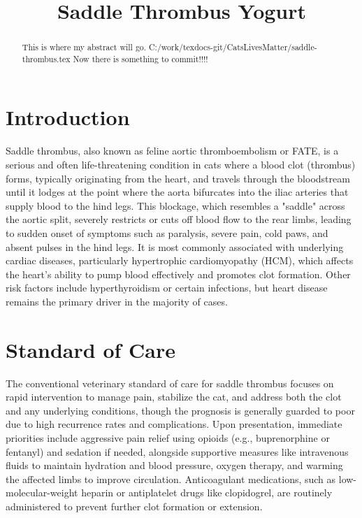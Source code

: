 \documentclass[]{article}
\title{Saddle Thrombus Yogurt}
\author{}
\begin{document}
\maketitle

\begin{abstract}
This is where my abstract will go.
C:/work/texdocs-git/CatsLivesMatter/saddle-thrombus.tex
Now there is something to commit!!!!
\end{abstract}

\section{Introduction}

Saddle thrombus, also known as feline aortic thromboembolism or FATE, is a serious and often life-threatening condition in cats where a blood clot (thrombus) forms, typically originating from the heart, and travels through the bloodstream until it lodges at the point where the aorta bifurcates into the iliac arteries that supply blood to the hind legs. This blockage, which resembles a "saddle" across the aortic split, severely restricts or cuts off blood flow to the rear limbs, leading to sudden onset of symptoms such as paralysis, severe pain, cold paws, and absent pulses in the hind legs. It is most commonly associated with underlying cardiac diseases, particularly hypertrophic cardiomyopathy (HCM), which affects the heart's ability to pump blood effectively and promotes clot formation. Other risk factors include hyperthyroidism or certain infections, but heart disease remains the primary driver in the majority of cases. 

\section{Standard of Care}
The conventional veterinary standard of care for saddle thrombus focuses on rapid intervention to manage pain, stabilize the cat, and address both the clot and any underlying conditions, though the prognosis is generally guarded to poor due to high recurrence rates and complications. Upon presentation, immediate priorities include aggressive pain relief using opioids (e.g., buprenorphine or fentanyl) and sedation if needed, alongside supportive measures like intravenous fluids to maintain hydration and blood pressure, oxygen therapy, and warming the affected limbs to improve circulation. Anticoagulant medications, such as low-molecular-weight heparin or antiplatelet drugs like clopidogrel, are routinely administered to prevent further clot formation or extension. 
\end{document}
